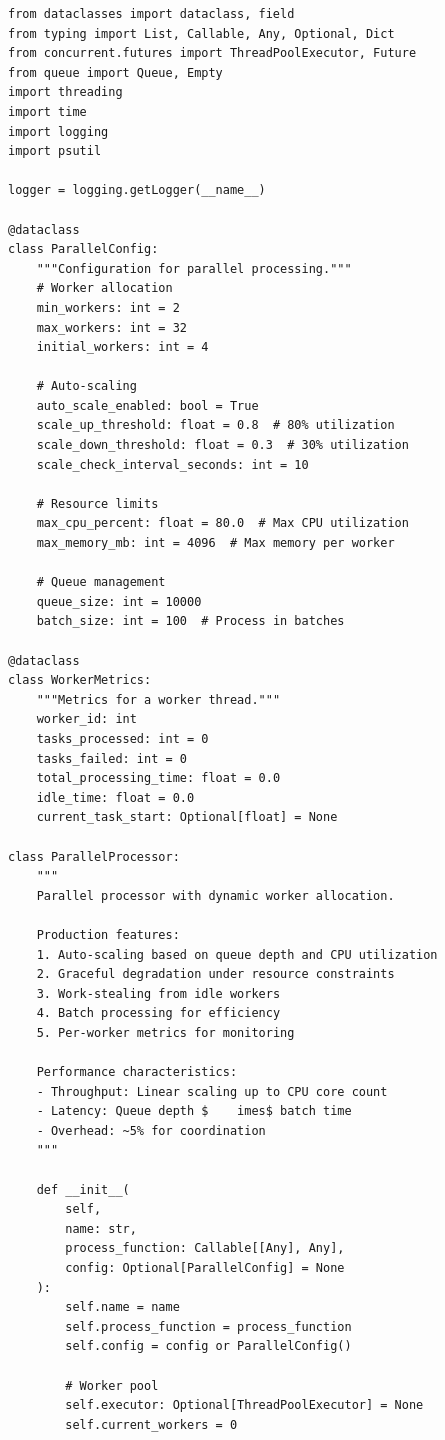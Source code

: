 \begin{lstlisting}[style=python, caption={Parallel Processor with Dynamic Allocation}]
from dataclasses import dataclass, field
from typing import List, Callable, Any, Optional, Dict
from concurrent.futures import ThreadPoolExecutor, Future
from queue import Queue, Empty
import threading
import time
import logging
import psutil

logger = logging.getLogger(__name__)

@dataclass
class ParallelConfig:
    """Configuration for parallel processing."""
    # Worker allocation
    min_workers: int = 2
    max_workers: int = 32
    initial_workers: int = 4

    # Auto-scaling
    auto_scale_enabled: bool = True
    scale_up_threshold: float = 0.8  # 80% utilization
    scale_down_threshold: float = 0.3  # 30% utilization
    scale_check_interval_seconds: int = 10

    # Resource limits
    max_cpu_percent: float = 80.0  # Max CPU utilization
    max_memory_mb: int = 4096  # Max memory per worker

    # Queue management
    queue_size: int = 10000
    batch_size: int = 100  # Process in batches

@dataclass
class WorkerMetrics:
    """Metrics for a worker thread."""
    worker_id: int
    tasks_processed: int = 0
    tasks_failed: int = 0
    total_processing_time: float = 0.0
    idle_time: float = 0.0
    current_task_start: Optional[float] = None

class ParallelProcessor:
    """
    Parallel processor with dynamic worker allocation.

    Production features:
    1. Auto-scaling based on queue depth and CPU utilization
    2. Graceful degradation under resource constraints
    3. Work-stealing from idle workers
    4. Batch processing for efficiency
    5. Per-worker metrics for monitoring

    Performance characteristics:
    - Throughput: Linear scaling up to CPU core count
    - Latency: Queue depth $	imes$ batch time
    - Overhead: ~5% for coordination
    """

    def __init__(
        self,
        name: str,
        process_function: Callable[[Any], Any],
        config: Optional[ParallelConfig] = None
    ):
        self.name = name
        self.process_function = process_function
        self.config = config or ParallelConfig()

        # Worker pool
        self.executor: Optional[ThreadPoolExecutor] = None
        self.current_workers = 0


\end{lstlisting}
